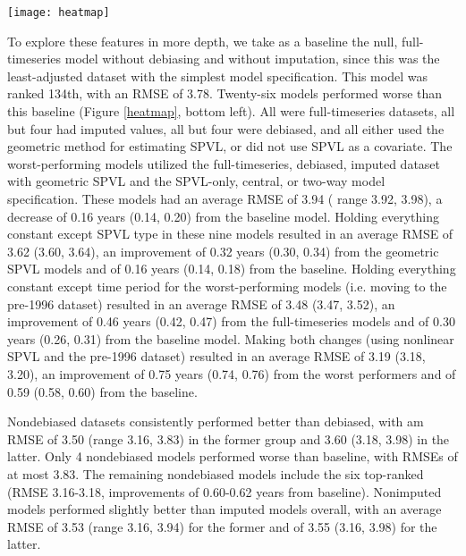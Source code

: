 \documentclass[12pt, titlepage, proquest]{article}
\begin{document}
\begin{sidewaysfigure}
	\caption{Heatmap of Root Mean Squared Errors (RMSEs) for every data transform-model specification combination. Ranking listed below RMSE. UB: Upper Bound.}
	\label{heatmap}
		\texttt{[image: heatmap]}
\end{sidewaysfigure}

To explore these features in more depth, we take as a baseline the null, full-timeseries model without debiasing and without imputation, since this was the least-adjusted dataset with the simplest model specification. This model was ranked 134th, with an RMSE of 3.78. Twenty-six models performed worse  than this baseline (Figure \ref{heatmap}, bottom left). All were full-timeseries datasets, all but four had imputed values, all but four were debiased, and all either used the geometric method for estimating SPVL, or did not use SPVL as a covariate. The worst-performing models utilized the full-timeseries, debiased, imputed dataset with geometric SPVL and the SPVL-only, central, or two-way model specification. These models had an average RMSE of 3.94 ( range 3.92, 3.98), a decrease of 0.16 years (0.14, 0.20) from the baseline model. Holding everything constant except SPVL type in these nine models resulted in an average RMSE of 3.62 (3.60, 3.64), an improvement of 0.32 years (0.30, 0.34) from the geometric SPVL models and of 0.16 years (0.14, 0.18) from the baseline. Holding everything constant except time period for the worst-performing models (i.e. moving to the pre-1996 dataset) resulted in an average RMSE of 3.48 (3.47, 3.52), an improvement of 0.46 years (0.42, 0.47) from the full-timeseries models and of 0.30 years (0.26, 0.31) from the baseline model. Making both changes (using nonlinear SPVL and the pre-1996 dataset) resulted in an average RMSE of 3.19 (3.18, 3.20), an improvement of 0.75 years (0.74, 0.76) from the worst performers and of 0.59 (0.58, 0.60) from the baseline. 

Nondebiased datasets consistently performed better than debiased, with am RMSE of 3.50 (range 3.16, 3.83) in the former group and 3.60 (3.18, 3.98) in the latter. Only 4 nondebiased models performed worse than baseline, with RMSEs of at most 3.83. The remaining nondebiased models include the six top-ranked (RMSE 3.16-3.18, improvements of 0.60-0.62 years from baseline). Nonimputed models performed slightly better than imputed models overall, with an average RMSE of 3.53 (range 3.16, 3.94) for the former and of 3.55 (3.16, 3.98) for the latter. 
\end{document}

